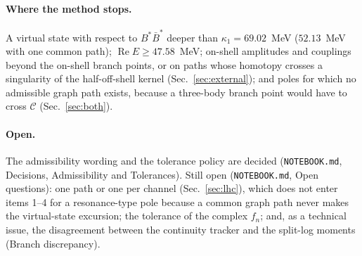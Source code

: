\documentclass[11pt]{article}
\newcommand{\file}[1]{\nolinkurl{#1}}
\begin{document}
\paragraph{Where the method stops.}
A virtual state with respect to $B^*\bar B^*$ deeper than $\kappa_1=69.02$~MeV ($52.13$~MeV with one common path); $\operatorname{Re}E\ge47.58$~MeV; on-shell amplitudes and couplings beyond the on-shell branch points, or on paths whose homotopy crosses a singularity of the half-off-shell kernel (Sec.~\ref{sec:external}); and poles for which no admissible graph path exists, because a three-body branch point would have to cross $\mathcal C$ (Sec.~\ref{sec:both}).

\paragraph{Open.}
The admissibility wording and the tolerance policy are decided (\file{NOTEBOOK.md}, Decisions, Admissibility and Tolerances). Still open (\file{NOTEBOOK.md}, Open questions): one path or one per channel (Sec.~\ref{sec:lhc}), which does not enter items 1--4 for a resonance-type pole because a common graph path never makes the virtual-state excursion; the tolerance of the complex $f_n$; and, as a technical issue, the disagreement between the continuity tracker and the split-log moments (Branch discrepancy).


\end{document}
